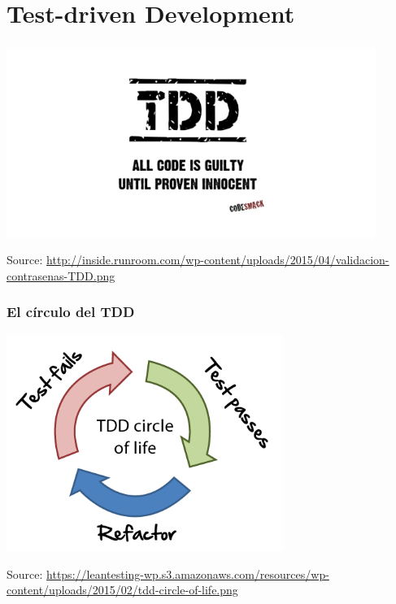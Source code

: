 \section{Test-driven Development}


\begin{frame}
\frametitle{}

\begin{center}
  \includegraphics[width=12cm]{figs/validacion-contrasenas-TDD.png}
\end{center}


\begin{flushright}
{\tiny
Source: \url{http://inside.runroom.com/wp-content/uploads/2015/04/validacion-contrasenas-TDD.png}
}
\end{flushright}

\end{frame}



\begin{frame}
\frametitle{El círculo del TDD}

\begin{center}
  \includegraphics[width=9cm]{figs/tdd-circle-of-life.png}
\end{center}


\begin{flushright}
{\tiny
Source: \url{https://leantesting-wp.s3.amazonaws.com/resources/wp-content/uploads/2015/02/tdd-circle-of-life.png}
}
\end{flushright}

\end{frame}

